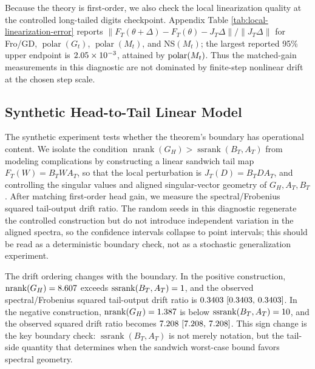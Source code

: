 \documentclass{article}
\theoremstyle{definition}
\newcommand{\norm}[1]{\left\lVert #1 \right\rVert}
\newcommand{\nrank}{\operatorname{nrank}}
\newcommand{\ssrank}{\operatorname{ssrank}}
\newcommand{\polar}{\operatorname{polar}}
\begin{document}
Because the theory is first-order, we also check the local linearization quality at the controlled long-tailed digits checkpoint. Appendix Table \ref{tab:local-linearization-error} reports \(\norm{F_T(\theta+\Delta)-F_T(\theta)-J_T\Delta}/\norm{J_T\Delta}\) for Fro/GD, \(\polar(G_t)\), \(\polar(M_t)\), and NS\((M_t)\); the largest reported 95\% upper endpoint is \(2.05\times 10^{-3}\), attained by \(\EelevenLocalLinearizationMaxRelativeErrorDirection\). Thus the matched-gain measurements in this diagnostic are not dominated by finite-step nonlinear drift at the chosen step scale.

\subsection{Synthetic Head-to-Tail Linear Model}

The synthetic experiment tests whether the theorem's boundary has operational content. We isolate the condition \(\nrank(G_H)>\ssrank(B_T,A_T)\) from modeling complications by constructing a linear sandwich tail map \(F_T(W)=B_TWA_T\), so that the local perturbation is \(J_T(D)=B_TDA_T\), and controlling the singular values and aligned singular-vector geometry of \(G_H,A_T,B_T\). After matching first-order head gain, we measure the spectral/Frobenius squared tail-output drift ratio. The random seeds in this diagnostic regenerate the controlled construction but do not introduce independent variation in the aligned spectra, so the confidence intervals collapse to point intervals; this should be read as a deterministic boundary check, not as a stochastic generalization experiment.

The drift ordering changes with the boundary. In the positive construction, \(\nrank(G_H)=\EelevenHeadTailPositiveNrankG\) exceeds \(\ssrank(B_T,A_T)=\EelevenHeadTailPositiveSsrankBTA\), and the observed spectral/Frobenius squared tail-output drift ratio is \(0.3403 ~\text{[0.3403,\hspace{0.35em}0.3403]}\). In the negative construction, \(\nrank(G_H)=\EelevenHeadTailNegativeNrankG\) is below \(\ssrank(B_T,A_T)=\EelevenHeadTailNegativeSsrankBTA\), and the observed squared drift ratio becomes \(7.208 ~\text{[7.208,\hspace{0.35em}7.208]}\).
This sign change is the key boundary check: \(\ssrank(B_T,A_T)\) is not merely notation, but the tail-side quantity that determines when the sandwich worst-case bound favors spectral geometry.
\end{document}
